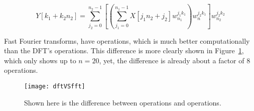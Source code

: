         \begin{equation}
            Y[k_1+k_2n_2]=\sum_{j_2=0}^{n_2-1}\left[ \left( \sum_{j_1=0}^{n_1-1}
                X[j_1n_2+j_2]w_{n_1}^{j_1k_1} \right)w_n^{j_2k_1} \right]w_{n_2}^{j_2k_2}
            \end{equation}


            Fast Fourier transforms,
            have  operations, which is much better
            computationally than the DFT's  operations. This difference is more clearly shown in
            Figure~\ref{fig:dftVSfft}, which only shows up to $n=20$, yet, the difference is
            already about a factor of 8 operations.

            \begin{figure}[htbp!]
                \begin{center}
                    \texttt{[image: dftVSfft]}
                \end{center}
                \caption{Shown here is the difference between  operations and
                 operations.}
                \label{fig:dftVSfft}
            \end{figure}


